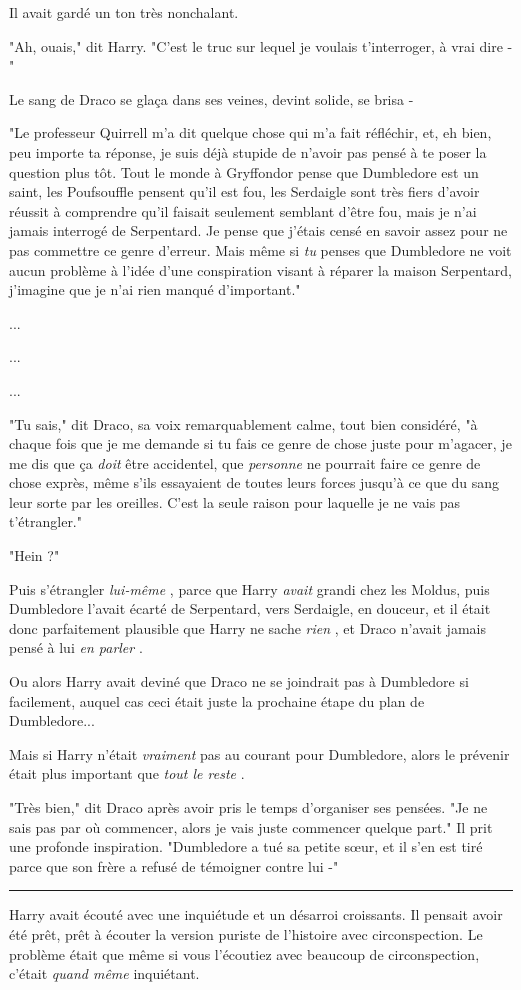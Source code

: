 Il avait gardé un ton très nonchalant.

"Ah, ouais," dit Harry. "C'est le truc sur lequel je voulais t'interroger, à vrai dire -"

Le sang de Draco se glaça dans ses veines, devint solide, se brisa -

"Le professeur Quirrell m'a dit quelque chose qui m'a fait réfléchir, et, eh bien, peu importe ta réponse, je suis déjà stupide de n'avoir pas pensé à te poser la question plus tôt. Tout le monde à Gryffondor pense que Dumbledore est un saint, les Poufsouffle pensent qu'il est fou, les Serdaigle sont très fiers d'avoir réussit à comprendre qu'il faisait seulement semblant d'être fou, mais je n'ai jamais interrogé de Serpentard. Je pense que j'étais censé en savoir assez pour ne pas commettre ce genre d'erreur. Mais même si \emph{tu}  penses que Dumbledore ne voit aucun problème à l'idée d'une conspiration visant à réparer la maison Serpentard, j'imagine que je n'ai rien manqué d'important."

...

...

...

"Tu sais," dit Draco, sa voix remarquablement calme, tout bien considéré, "à chaque fois que je me demande si tu fais ce genre de chose juste pour m'agacer, je me dis que ça \emph{doit } être accidentel, que \emph{personne}  ne pourrait faire ce genre de chose exprès, même s'ils essayaient de toutes leurs forces jusqu'à ce que du sang leur sorte par les oreilles. C'est la seule raison pour laquelle je ne vais pas t'étrangler."

"Hein ?"

Puis s'étrangler \emph{lui-même} , parce que Harry \emph{avait}  grandi chez les Moldus, puis Dumbledore l'avait écarté de Serpentard, vers Serdaigle, en douceur, et il était donc parfaitement plausible que Harry ne sache \emph{rien} , et Draco n'avait jamais pensé à lui \emph{en parler} .

Ou alors Harry avait deviné que Draco ne se joindrait pas à Dumbledore si facilement, auquel cas ceci était juste la prochaine étape du plan de Dumbledore...

Mais si Harry n'était \emph{vraiment}  pas au courant pour Dumbledore, alors le prévenir était plus important que \emph{tout le reste} .

"Très bien," dit Draco après avoir pris le temps d'organiser ses pensées. "Je ne sais pas par où commencer, alors je vais juste commencer quelque part." Il prit une profonde inspiration. "Dumbledore a tué sa petite sœur, et il s'en est tiré parce que son frère a refusé de témoigner contre lui -"
\par\noindent\rule{\textwidth}{0.4pt}
Harry avait écouté avec une inquiétude et un désarroi croissants. Il pensait avoir été prêt, prêt à écouter la version puriste de l'histoire avec circonspection. Le problème était que même si vous l'écoutiez avec beaucoup de circonspection, c'était \emph{quand même}  inquiétant.

